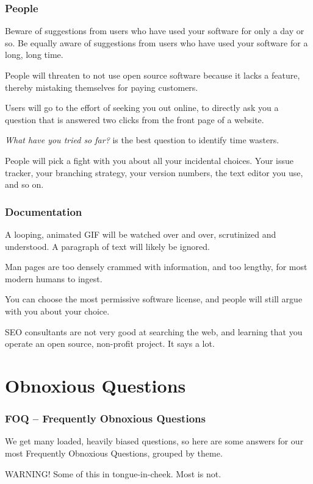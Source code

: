 \documentclass[t,handout]{beamer}
\begin{document}
\begin{frame}[fragile]\frametitle{People}
    \vfill
    Beware of suggestions from users who have used your software for only a day or so. Be equally aware of suggestions from users who have used your software for a long, long time.

    People will threaten to not use open source software because it lacks a feature, thereby mistaking themselves for paying customers.

    Users will go to the effort of seeking you out online, to directly ask you a question that is answered two clicks from the front page of a website.

    \textit{What have you tried so far?} is the best question to identify time wasters.

    People will pick a fight with you about all your incidental choices. Your issue tracker, your branching strategy, your version numbers, the text editor you use, and so on.
\end{frame}

\begin{frame}[fragile]\frametitle{Documentation}
    \vfill
    A looping, animated GIF will be watched over and over, scrutinized and understood. A paragraph of text will likely be ignored.

    Man pages are too densely crammed with information, and too lengthy, for most modern humans to ingest.

    You can choose the most permissive software license, and people will still argue with you about your choice.

    SEO consultants are not very good at searching the web, and learning that you operate an open source, non-profit project. It says a lot.
\end{frame}

\section{Obnoxious Questions}

\begin{frame}[fragile]\frametitle{FOQ -- Frequently Obnoxious Questions}
    \vfill
    We get many loaded, heavily biased questions, so here are some answers for our most Frequently Obnoxious Questions, grouped by theme.

    \begin{alertblock}{WARNING!}
        Some of this in tongue-in-cheek. Most is not.
    \end{alertblock}
    \vfill
\end{frame}
\end{document}
